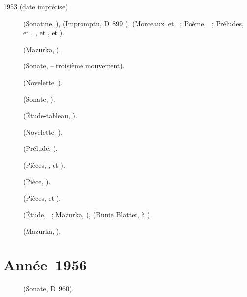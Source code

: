 \begin{description}
 \item[1953 (date imprécise)]
 \Kabalevski{} (Sonatine,  ), \Schubert{} (Impromptu,
 D~899 ), \Scriabine{} (Morceaux,   et
 ~; Poème,  ~; Préludes,  
 et ,  ,  et , 
  et ).
 \item[]
 \Scriabine{} (Mazurka,  ).
 \item[]
 \Schumann{} (Sonate,  -- troisième mouvement).
 \item[]
 \Schumann{} (Novelette,  ).
 \item[]
 \Beethoven{} (Sonate, ).
 \item[]
 \Rachmaninov{} (Étude-tableau,  ).
 \item[]
 \Schumann{} (Novelette,  ).
 \item[]
 \Chopin{} (Prélude,  ).
 \item[]
 \Prokofiev{} (Pièces,  ,  et ).
 \item[]
 \Prokofiev{} (Pièce,  ).
 \item[]
 \Prokofiev{} (Pièces,   et ).
 \item[]
 \Chopin{} (Étude,  ~; Mazurka,  ),
 \Schumann{} (Bunte Blätter,   à ).
 \item[]
 \Chopin{} (Mazurka,  ).
\end{description}

\section{Année~1956}

\begin{description}
 \item[]
 \Schubert{} (Sonate, D~960).
\end{description}

